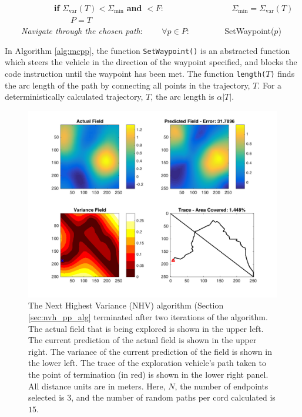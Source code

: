 \begin{algorithm}[h!]
\begin{algorithmic}[1]
	\State \ \ \ \  \ \ \ \  \ \ \ \ \textbf{if} $\Sigma_{\text{var}}(T) < \Sigma_{\text{min}}$ \textbf{and}  $< F$:
	\State \ \ \ \  \ \ \ \  \ \ \ \ \ \ \ \ $\Sigma_{\text{min}} = \Sigma_{\text{var}}(T)$
	\State \ \ \ \  \ \ \ \  \ \ \ \ \ \ \ \ $P = T$\\

	\BState \ \ \ \  \emph{Navigate through the chosen path}:
	\State \ \ \ \  $\forall p \in P$:
	\State \ \ \ \  \ \ \ \ SetWaypoint($p$) 
\EndProcedure
\end{algorithmic}
\end{algorithm}

In Algorithm \ref{alg:mcpp}, the function \texttt{SetWaypoint()} is an abstracted function which steers the vehicle in the direction of the waypoint specified, and blocks the code instruction until the waypoint has been met. The function \texttt{length(}$T$\texttt{)} finds the arc length of the path by connecting all points in the trajectory, $T$. For a deterministically calculated trajectory, $T$, the arc length is $\alpha |T|$.

\begin{figure}[hb!]
	\centering
	\includegraphics[width=0.95\linewidth]{figures/mc_4panel.png}
    \captionsetup{skip=0.20\baselineskip,size=footnotesize}
	\caption{The Next Highest Variance (NHV) algorithm (Section \ref{sec:nvh_pp_alg} terminated after two iterations of the algorithm. The actual field that is being explored is shown in the upper left. The current prediction of the actual field is shown in the upper right. The variance of the current prediction of the field is shown in the lower left. The trace of the exploration vehicle's path taken to the point of termination (in red) is shown in the lower right panel. All distance units are in meters. Here, $N$, the number of endpoints selected is $3$, and the number of random paths per cord calculated is $15$.}
	\label{fig:mcpp}
\end{figure}

